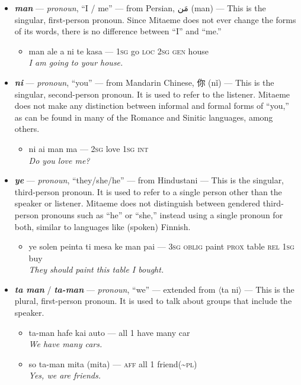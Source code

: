 \documentclass[a4paper, titlepage]{article}
\begin{document}
\begin{itemize}
	\item \textbf{\textit{man}} — \textit{pronoun}, ``I / me'' — from Persian, {\afont  مَن} (man) — This is the singular, first-person pronoun. Since Mitaeme does not ever change the forms of its words, there is no difference between ``I'' and ``me.''
	\begin{itemize}
		\item man ale a ni te kasa — \textsc{1sg} go \textsc{loc 2sg gen} house \\\textit{I am going to your house.}
	\end{itemize}
	\item \textbf{\textit{ni}} — \textit{pronoun}, ``you'' — from Mandarin Chinese, 你 (nǐ) — This is the singular, second-person pronoun. It is used to refer to the listener. Mitaeme does not make any distinction between informal and formal forms of ``you,'' as can be found in many of the Romance and Sinitic languages, among others.
	\begin{itemize}
		\item ni ai man ma — \textsc{2sg} love \textsc{1sg int} \\\textit{Do you love me?}
	\end{itemize}
	\item \textbf{\textit{ye}} — \textit{pronoun}, ``they/she/he'' — from Hindustani — This is the singular, third-person pronoun. It is used to refer to a single person other than the speaker or listener. Mitaeme does not distinguish between gendered third-person pronouns such as ``he'' or ``she,'' instead using a single pronoun for both, similar to languages like (spoken) Finnish.
	\begin{itemize}
		\item ye solen peinta ti mesa ke man pai — \textsc{3sg oblig} paint \textsc{prox} table \textsc{rel 1sg} buy \\\textit{They should paint this table I bought.}
	\end{itemize}
	\item \textbf{\textit{ta man}} / \textbf{\textit{ta-man}} — \textit{pronoun}, ``we'' — extended from $\langle$ta ni$\rangle$ — This is the plural, first-person pronoun. It is used to talk about groups that include the speaker.
	\begin{itemize}
		\item ta-man hafe kai auto — all 1 have many car \\\textit{We have many cars.}
		\item so ta-man mita (mita) — \textsc{aff} all 1 friend(\textasciitilde{}\textsc{pl}) \\\textit{Yes, we are friends.}

\end{itemize}
\end{itemize}
\end{document}
